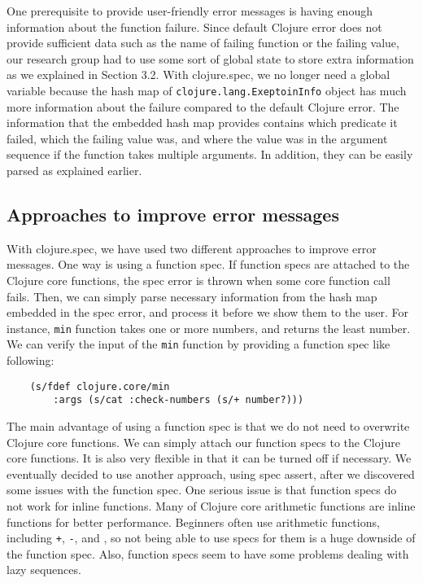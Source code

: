 \documentclass[12pt]{article}
\begin{document}
	One prerequisite to provide user-friendly error messages is having enough information about the function failure. Since 
	default Clojure error does not provide sufficient data such as the name of failing function or the failing value, our 
	research group had to use some sort of global state to store extra information as we explained in Section 3.2. 
	With clojure.spec, we no longer need a global variable because the hash map of {\tt clojure.lang.ExeptoinInfo} object 
	has much more information about the 
	failure compared to the default Clojure error. The information that the embedded hash map provides contains which predicate it 
	failed, which the failing value was, and where the value was in the argument sequence if the function takes multiple 
	arguments. In addition, they can be easily parsed as explained earlier.
	
	\subsection{Approaches to improve error messages}
	With clojure.spec, we have used two different approaches to improve error messages. One way is using a function spec. 
	If function specs are attached to the Clojure core functions, the spec error is thrown when some core function 
	call fails. Then, we can simply parse necessary information from the hash map embedded in the spec error, and 
	process it before we show them to the user. For instance, {\tt min} function 
	takes one or more numbers, and returns the least number. We can verify the input of the {\tt min} function by providing a 
	function spec like following:

	\begin{verbatim}
	(s/fdef clojure.core/min
		:args (s/cat :check-numbers (s/+ number?)))
	\end{verbatim}

	The main advantage of using a function spec is that we do not need to overwrite Clojure core functions. We can simply attach our 
	function specs to the Clojure core functions. It is also very flexible in that it can be turned off if necessary. 
	We eventually decided to use another approach, using spec assert, after we 
	discovered some issues with the function spec. One serious issue is that function specs do not work for inline functions. 
	Many of Clojure core arithmetic functions are inline functions for better performance. 
	Beginners often use arithmetic functions, including {\tt +}, {\tt -}, and {\tt *}, 
	so not being able to use specs for them is a huge downside of the function spec. 
	Also, function specs seem to have some problems dealing with lazy sequences. 
\end{document}
